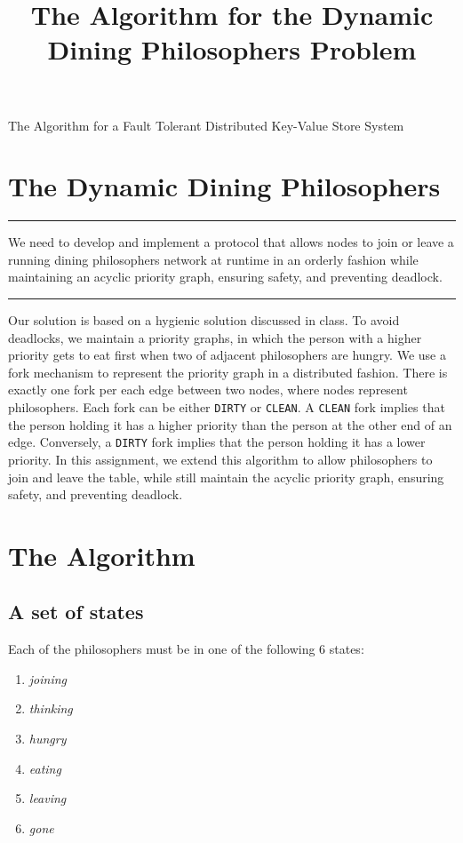 \documentclass[11pt]{article}
\title{The Algorithm for the Dynamic Dining Philosophers Problem}
\newenvironment{problem}[1]{
\medskip \hrule \medskip
\noindent {\bf Problem #1.}
}{
\medskip \hrule \medskip
}
\begin{document}
\pagestyle{fancy}


\vspace*{0.1in}
\begin{center} \Large The Algorithm for a Fault Tolerant Distributed Key-Value Store System \end{center}

\section{The Dynamic Dining Philosophers}
\begin{problem}{Statement}
We need to develop and implement a protocol that allows nodes to join or leave a running dining philosophers network at runtime in an orderly fashion while maintaining an acyclic priority graph, ensuring safety, and preventing deadlock.
\end{problem}

Our solution is based on a hygienic solution discussed in class. To avoid deadlocks, we maintain a priority graphs, in which the person with a higher priority gets to eat first when two of adjacent philosophers are hungry. We use a fork mechanism to represent the priority graph in a distributed fashion. There is exactly one fork per each edge between two nodes, where nodes represent philosophers. Each fork can be either \texttt{DIRTY} or \texttt{CLEAN}. A \texttt{CLEAN} fork implies that the person holding it has a higher priority than the person at the other end of an edge. Conversely, a \texttt{DIRTY} fork implies that the person holding it has a lower priority. In this assignment, we extend this algorithm to allow philosophers to join and leave the table, while still maintain the acyclic priority graph, ensuring safety, and preventing deadlock.


\section{The Algorithm}
\subsection{A set of states}
Each of the philosophers must be in one of the following 6 states:
\begin{enumerate}
\item \textit{joining}
\item \textit{thinking}
\item \textit{hungry}
\item \textit{eating}
\item \textit{leaving}
\item \textit{gone}
\end{enumerate}
\end{document}
